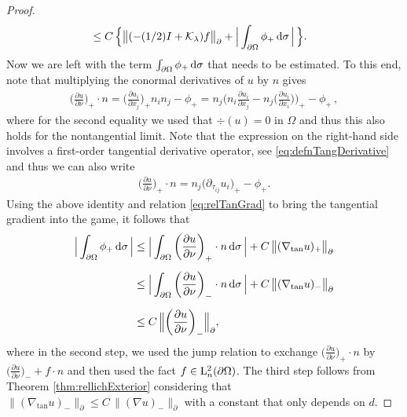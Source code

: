 \begin{proof}
\begin{align}
    \label{eq:estimatef}
    &\leq C \, \Big\{ \big\| (-(1/2)I + \mathcal{K}_\lambda) f \big\|^{}_\partial +  \Big| \int_{\partial\Omega} \phi_+ \, {\operatorname{d}\!{\sigma}} \, \Big|\,\Big\}.
  \end{align}
  Now we are left with the term $\int_{\partial\Omega} \phi_+ \, {\operatorname{d}\!{\sigma}}$ that needs to be estimated.
  To this end, note that multiplying the conormal derivatives of $u$ by $n$ gives
  \begin{align*}
    \bigg( \frac{\partial u}{\partial \nu} \bigg)_+ \cdot n
    = \bigg( \frac{\partial u_i}{\partial x_j}\bigg)_+ n_i n_j - \phi_+
    = n_j \bigg( n_i \frac{\partial u_i}{\partial x_j} - n_j \bigg( \frac{\partial u_i}{\partial x_i} \bigg) \bigg)_+ - \phi_+\, ,
  \end{align*}
  where for the second equality we used that $\div(u) = 0$ in $\Omega$ and thus this also holds for the nontangential limit.
  Note that the expression on the right-hand side involves a first-order tangential derivative operator, see \eqref{eq:defnTangDerivative} and thus we can also write
  \begin{align*}
    \bigg( \frac{\partial u}{\partial \nu} \bigg)_+ \cdot n 
    = n_j \big( \partial_{\tau_{ij}}u_i \big)_+ - \phi_+.
  \end{align*}
  Using the above identity and relation \eqref{eq:relTanGrad} to bring the tangential gradient into the game, it follows that
  \begin{align}
    \Big| \int_{\partial\Omega} \phi_+ \, {\operatorname{d}\!{\sigma}} \, \Big|
    &\leq \Big| \int_{\partial\Omega} \bigg( \frac{\partial u}{\partial \nu} \bigg)_+ \cdot n \, {\operatorname{d}\!{\sigma}} \, \Big|  + C\, \big\|(\nabla_{\mathrm{tan}} u)_+ \big\|^{}_\partial \nonumber\\[0.5em]
    &\leq \Big| \int_{\partial\Omega} \bigg( \frac{\partial u}{\partial \nu} \bigg)_- \cdot n \, {\operatorname{d}\!{\sigma}} \, \Big| +  C\, \big\| (\nabla_{\mathrm{tan}} u)_-\big\|^{}_\partial \nonumber\\[0.5em]
    \label{eq:estimatephiplus}
    &\leq C\, \Big\| \bigg( \frac{\partial u}{\partial \nu} \bigg)_- \Big\|^{}_\partial,
  \end{align}
  where in the second step, we used the jump relation to exchange $\big(\frac{\partial u}{\partial \nu}\big)_+ \cdot n$ by $\big(\frac{\partial u}{\partial \nu} \big)_- + f \cdot n$ and then used the fact $f \in \mathrm{L}^2_n(\partial\Omega)$.
  The third step follows from Theorem \ref{thm:rellichExterior} considering that $\big\|(\nabla_{\mathrm{tan}} u)_- \big\|^{}_\partial \leq C\, \|(\nabla u)_- \|^{}_{\partial}$ with a constant that only depends on $d$.

\end{proof}
